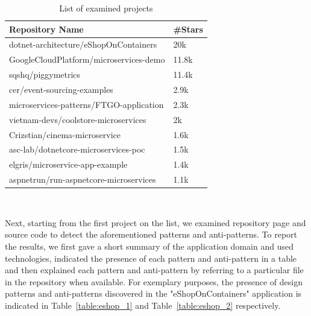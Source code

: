 \documentclass[11pt,a4paper,twocolumn]{article}
\begin{document}
\begin{table}[H]
\centering 
    \begin{tabular}{ 
  | >{\centering\arraybackslash} m{15.3em} 
  | >{\centering\arraybackslash} m{3.5em} | }
    \hline
    \rowcolor{bluepoli!40}
    \textbf{Repository Name} & \textbf{\#Stars}\T\B \\
    \hline \hline
    dotnet-architecture/eShopOnContainers & 20k\T\B\\
    \hline
    \rowcolor{bluepoli!10}
    GoogleCloudPlatform/microservices-demo & 11.8k\T\B\\
    \hline
    sqshq/piggymetrics & 11.4k\T\B\\
    \hline
    \rowcolor{bluepoli!10}
    cer/event-sourcing-examples & 2.9k\T\B\\
    \hline
    microservices-patterns/FTGO-application & 2.3k\T\B\\
    \hline
    \rowcolor{bluepoli!10}
    vietnam-devs/coolstore-microservices & 2k\T\B\\
    \hline
    Crizstian/cinema-microservice & 1.6k\T\B\\
    \hline
    \rowcolor{bluepoli!10}
    asc-lab/dotnetcore-microservices-poc & 1.5k\T\B\\
    \hline
    elgris/microservice-app-example & 1.4k\T\B\\
    \hline
    \rowcolor{bluepoli!10}
    aspnetrun/run-aspnetcore-microservices & 1.1k\T\B\\
    \hline
    \end{tabular}
    \\[10pt]
    \caption{List of examined projects}
    \label{table:project_list}
\end{table}

Next, starting from the first project on the list, we examined repository page and source code to detect the aforementioned patterns and anti-patterns.
To report the results, we first gave a short summary of the application domain and used technologies, indicated the presence of each pattern and anti-pattern in a table and then explained each pattern and anti-pattern by referring to a particular file in the repository when available.
For exemplary purposes, the presence of design patterns and anti-patterns discovered in the "eShopOnContainers" application is indicated in Table~\ref{table:eshop_1} and Table~\ref{table:eshop_2} respectively.
\end{document}
